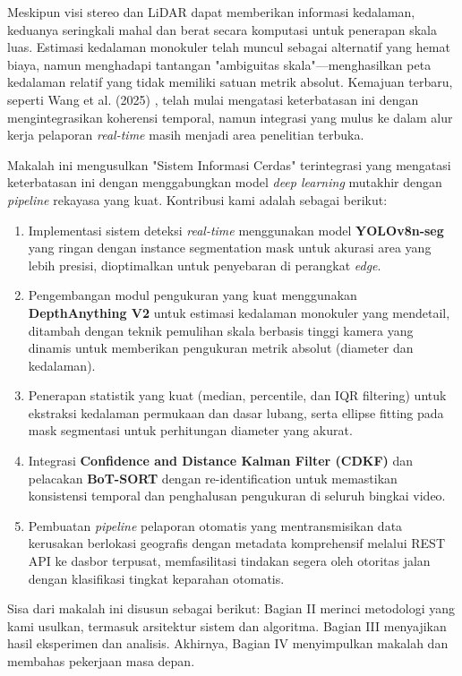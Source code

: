 \documentclass{iopjournal}
\begin{document}
Meskipun visi stereo dan LiDAR dapat memberikan informasi kedalaman, keduanya seringkali mahal dan berat secara komputasi untuk penerapan skala luas. Estimasi kedalaman monokuler telah muncul sebagai alternatif yang hemat biaya, namun menghadapi tantangan "ambiguitas skala"---menghasilkan peta kedalaman relatif yang tidak memiliki satuan metrik absolut. Kemajuan terbaru, seperti Wang et al. (2025) \cite{wang2025}, telah mulai mengatasi keterbatasan ini dengan mengintegrasikan koherensi temporal, namun integrasi yang mulus ke dalam alur kerja pelaporan \textit{real-time} masih menjadi area penelitian terbuka.

Makalah ini mengusulkan "Sistem Informasi Cerdas" terintegrasi yang mengatasi keterbatasan ini dengan menggabungkan model \textit{deep learning} mutakhir dengan \textit{pipeline} rekayasa yang kuat. Kontribusi kami adalah sebagai berikut:
\begin{enumerate}
    \item Implementasi sistem deteksi \textit{real-time} menggunakan model \textbf{YOLOv8n-seg} yang ringan dengan instance segmentation mask untuk akurasi area yang lebih presisi, dioptimalkan untuk penyebaran di perangkat \textit{edge}.
    \item Pengembangan modul pengukuran yang kuat menggunakan \textbf{DepthAnything V2} untuk estimasi kedalaman monokuler yang mendetail, ditambah dengan teknik pemulihan skala berbasis tinggi kamera yang dinamis untuk memberikan pengukuran metrik absolut (diameter dan kedalaman).
    \item Penerapan statistik yang kuat (median, percentile, dan IQR filtering) untuk ekstraksi kedalaman permukaan dan dasar lubang, serta ellipse fitting pada mask segmentasi untuk perhitungan diameter yang akurat.
    \item Integrasi \textbf{Confidence and Distance Kalman Filter (CDKF)} dan pelacakan \textbf{BoT-SORT} dengan re-identification untuk memastikan konsistensi temporal dan penghalusan pengukuran di seluruh bingkai video.
    \item Pembuatan \textit{pipeline} pelaporan otomatis yang mentransmisikan data kerusakan berlokasi geografis dengan metadata komprehensif melalui REST API ke dasbor terpusat, memfasilitasi tindakan segera oleh otoritas jalan dengan klasifikasi tingkat keparahan otomatis.
\end{enumerate}

Sisa dari makalah ini disusun sebagai berikut: Bagian II merinci metodologi yang kami usulkan, termasuk arsitektur sistem dan algoritma. Bagian III menyajikan hasil eksperimen dan analisis. Akhirnya, Bagian IV menyimpulkan makalah dan membahas pekerjaan masa depan.
\end{document}

